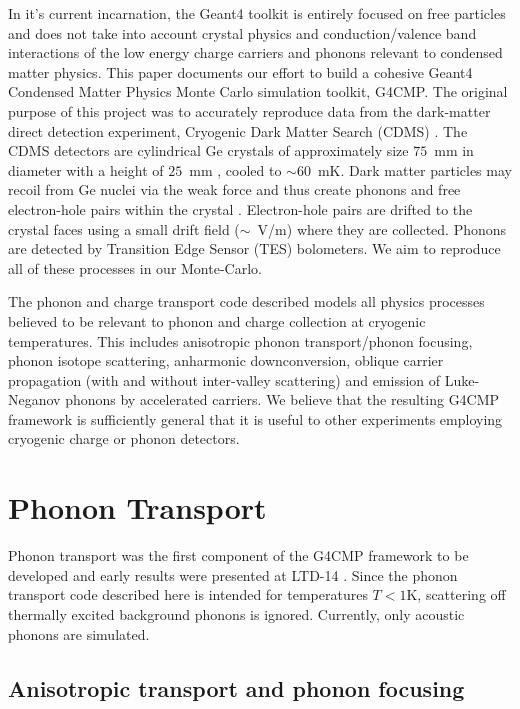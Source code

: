 \documentclass[preprint,12pt]{elsarticle}
\begin{document}
In it's current incarnation, the Geant4 toolkit is entirely focused on free particles and does not take into account crystal physics and conduction/valence band interactions of the low energy charge carriers and phonons relevant to condensed matter physics. This paper documents our effort to build a cohesive Geant4 Condensed Matter Physics Monte Carlo simulation toolkit, G4CMP. The original purpose of this project was to accurately reproduce data from the dark-matter direct detection experiment, Cryogenic Dark Matter Search (CDMS) \cite{CDMS-A}\cite{CDMS-B}\cite{CDMS-C}. The CDMS detectors are cylindrical Ge crystals of approximately size $75$~mm in diameter with a height of $25$~mm \cite{CDMS-E}, cooled to $\sim60$~mK. Dark matter particles may recoil from Ge nuclei via the weak force and thus create phonons and free electron-hole pairs within the crystal \cite{Lindhart}. Electron-hole pairs are drifted to the crystal faces using a small drift field ($\sim$~V/m) where they are collected. Phonons are 
detected by Transition Edge Sensor (TES) bolometers. We aim to reproduce all of these processes in our Monte-Carlo. 

The phonon and charge transport code described models all physics processes believed to be relevant to phonon and charge collection at cryogenic temperatures. This includes anisotropic phonon transport/phonon focusing, phonon isotope scattering, anharmonic downconversion, oblique carrier propagation (with and without inter-valley scattering) and emission of Luke-Neganov phonons by accelerated carriers. We believe that the resulting G4CMP framework is sufficiently general that it is useful to other experiments employing cryogenic charge or phonon detectors. 

\section{Phonon Transport}
\label{sec:PhononTransport}

Phonon transport was the first component of the G4CMP framework to be developed and early results were presented at LTD-14 \cite{Brandt}. Since the phonon transport code described here is intended for temperatures $T<1$K, scattering off thermally excited background phonons is ignored. Currently, only acoustic phonons are simulated.

\subsection{Anisotropic transport and phonon focusing}
\label{sec:Focusing}
\end{document}
